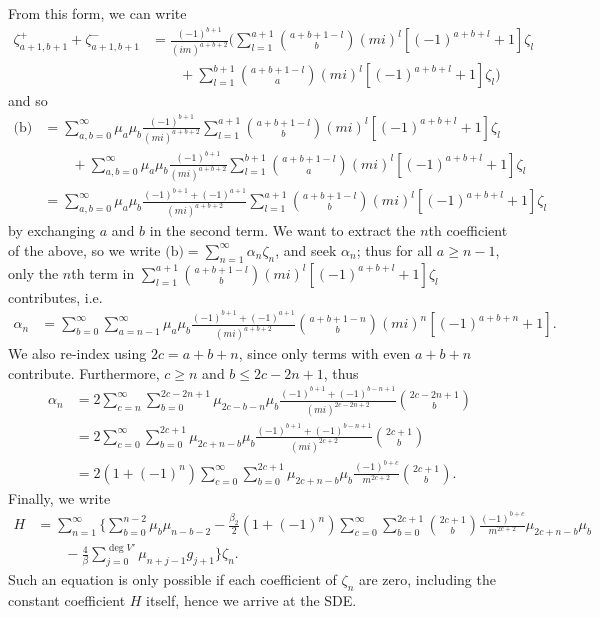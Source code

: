 \documentclass[10pt]{article}
\theoremstyle{plain}
\theoremstyle{definition}
\theoremstyle{plain}
\begin{document}
From this form, we can write
\begin{align*}
	\zeta^+_{a+1,b+1}+\zeta^-_{a+1,b+1} &= \frac{(-1)^{b+1}}{(im)^{a+b+2}}\bigg( \sum_{l=1}^{a+1} {a+b+1-l\choose b}(mi)^l[(-1)^{a+b+l}+1]\zeta_l \\ &\qquad+ \sum_{l=1}^{b+1}{a+b+1-l\choose a}(mi)^l[(-1)^{a+b+l}+1]\zeta_l\bigg)
\end{align*}
and so
\begin{align*}
	\text{(b)}&= \sum_{a,b=0}^\infty \mu_a\mu_b \frac{(-1)^{b+1}}{(mi)^{a+b+2}}\sum_{l=1}^{a+1}{a+b+1-l\choose b}(mi)^l[(-1)^{a+b+l}+1]\zeta_l \\ &\qquad+ \sum_{a,b=0}^\infty \mu_a\mu_b \frac{(-1)^{b+1}}{(mi)^{a+b+2}}\sum_{l=1}^{b+1}{a+b+1-l\choose a}(mi)^l[(-1)^{a+b+l}+1]\zeta_l  \\
	&= \sum_{a,b=0}^\infty \mu_a\mu_b \frac{(-1)^{b+1}+(-1)^{a+1}}{(mi)^{a+b+2}}\sum_{l=1}^{a+1}{a+b+1-l\choose b}(mi)^l[(-1)^{a+b+l}+1]\zeta_l
\end{align*}
by exchanging $a$ and $b$ in the second term. We want to extract the $n$th coefficient of the above, so we write $\text{(b)} = \sum_{n=1}^\infty \alpha_n \zeta_n$, and seek $\alpha_n$; thus for all $a\geq n-1$, only the $n$th term in $\sum_{l=1}^{a+1}{a+b+1-l\choose b}(mi)^l[(-1)^{a+b+l}+1]\zeta_l$ contributes, i.e.
\begin{align*}
	\alpha_n &= \sum_{b=0}^\infty\sum_{a=n-1}^\infty \mu_a\mu_b \frac{(-1)^{b+1}+(-1)^{a+1}}{(mi)^{a+b+2}}{a+b+1-n\choose b}(mi)^n[(-1)^{a+b+n}+1].
\end{align*}
We also re-index using $2c=a+b+n$, since only terms with even $a+b+n$ contribute. Furthermore, $c\geq n$ and $b \leq 2c-2n+1$, thus
\begin{align*}
	\alpha_n &= 2 \sum_{c=n}^\infty\sum_{b=0}^{2c-2n+1}\mu_{2c-b-n}\mu_b\frac{(-1)^{b+1}+(-1)^{b-n+1}}{(mi)^{2c-2n+2}}{2c-2n+1\choose b} \\
	&= 2\sum_{c=0}^\infty \sum_{b=0}^{2c+1} \mu_{2c+n-b}\mu_b\frac{(-1)^{b+1}+(-1)^{b-n+1}}{(mi)^{2c+2}}{2c+1\choose b} \\
	&= 2(1+(-1)^n)\sum_{c=0}^\infty \sum_{b=0}^{2c+1} \mu_{2c+n-b}\mu_b\frac{(-1)^{b+c}}{m^{2c+2}}{2c+1\choose b}.
\end{align*} 
Finally, we write
\begin{align*}
	H &= \sum_{n=1}^\infty\bigg\{ \sum_{b=0}^{n-2} \mu_b\mu_{n-b-2}  - \frac{\beta_2}{2}(1+(-1)^n)\sum_{c=0}^\infty\sum_{b=0}^{2c+1}{2c+1\choose b}\frac{(-1)^{b+c}}{m^{2c+2}} \mu_{2c+n-b}\mu_b  \\&\qquad-\frac{4}{\beta}\sum_{j=0}^{\deg V'}\mu_{n+j-1}g_{j+1}\bigg\}\zeta_n.
\end{align*}
Such an equation is only possible if each coefficient of $\zeta_n$ are zero, including the constant coefficient $H$ itself, hence we arrive at the SDE. 
\end{document}
